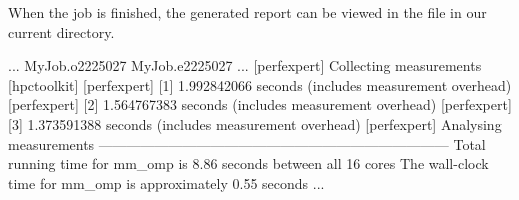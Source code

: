 When the job is finished, the generated report can be viewed in the file in our current directory.

\begin{prompt}
...
MyJob.o2225027
MyJob.e2225027
...
[perfexpert] Collecting measurements [hpctoolkit]
[perfexpert]    [1] 1.992842066 seconds (includes measurement overhead)
[perfexpert]    [2] 1.564767383 seconds (includes measurement overhead)
[perfexpert]    [3] 1.373591388 seconds (includes measurement overhead)
[perfexpert] Analysing measurements
---------------------------------------------------------------------------
Total running time for mm_omp is 8.86 seconds between all 16 cores
The wall-clock time for mm_omp is approximately 0.55 seconds
...
\end{prompt}

